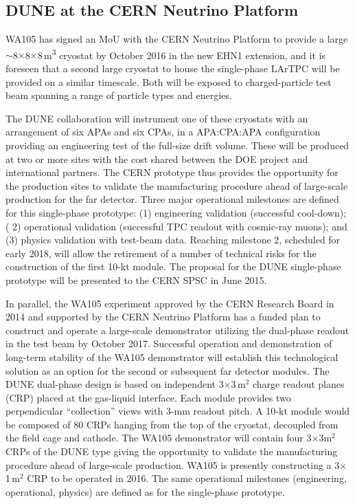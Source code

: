 \subsection{DUNE at the CERN Neutrino Platform}
\label{v1ch3:dune-at-cern}

WA105 has signed an MoU with the CERN Neutrino Platform to provide a large 
$\sim$8$\times$8$\times$8\,m\textsuperscript{3} cryostat by October 2016 in the new EHN1 extension, 
and it is foreseen that a second large cryostat to house the single-phase LArTPC will 
be provided on a similar timescale. Both will be exposed to charged-particle test 
beam spanning a range of particle types and energies.   

The DUNE collaboration will instrument one of these cryostats with an arrangement 
of six APAs and six CPAs, in a APA:CPA:APA configuration providing an engineering 
test of the full-size drift volume. These will be produced at two or more sites with the cost 
shared between the DOE project and international partners. The CERN prototype thus 
provides the opportunity for the production sites to validate the manufacturing 
procedure ahead of large-scale production for the far detector. Three major operational 
milestones are defined for this single-phase prototype: (1) engineering validation 
(successful cool-down); ( 2) operational validation (successful TPC readout with 
cosmic-ray muons); and (3) physics validation with test-beam data. Reaching milestone 
2, scheduled for early 2018, will allow the retirement of a number of technical 
risks for the construction of the first 10-kt module. The proposal for the DUNE 
single-phase prototype will be presented to the CERN SPSC in June 2015. 

In parallel, the WA105 experiment approved by the CERN Research Board in 2014 and supported 
by the CERN Neutrino Platform has a funded plan to construct and operate a large-scale 
demonstrator utilizing the dual-phase readout in the test beam by October 2017. 
Successful operation and demonstration of long-term stability of the WA105 demonstrator 
will establish this technological solution as an option for the second or subsequent 
far detector modules. The DUNE dual-phase design is based on independent 3$\times$3\,m$^2$
charge readout planes (CRP) placed at the gas-liquid interface. Each module provides 
two perpendicular ``collection'' views with 3-mm readout pitch. A 10-kt module 
would be composed of 80 CRPs hanging from the top of the cryostat, decoupled from 
the field cage and cathode. The WA105 demonstrator will contain four 3$\times$3m$^2$ 
CRPs of the DUNE type giving the opportunity to validate the manufacturing procedure 
ahead of large-scale production. WA105 is presently constructing a 3$\times$1\,m$^2$ 
CRP to be operated in 2016. The same operational milestones (engineering, operational, 
physics) are defined as for the single-phase prototype.


